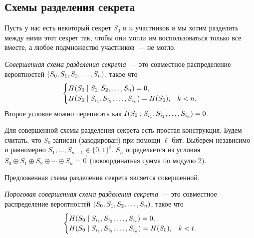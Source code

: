 \documentclass[12pt]{article}
\begin{document}
\subsection{Схемы разделения секрета}

Пусть у нас есть некоторый секрет $S_0$ и $n$ участников и мы хотим разделить между ними этот секрет
так, чтобы они могли им воспользоваться только все вместе, а любое подмножество участников~--- не
могло.
\begin{definition}
    \emph{Совершенная схема разделения секрета}~--- это совместное распределение вероятностей
    $(S_0,{S}_1,{S}_2,\dotsc,{S}_{n})$, такое что
    \[
    \begin{cases}
        H(S_0\mid{S}_1,{S}_2,\dotsc,{S}_{n}) = 0,\\
        H(S_0\mid{S}_{{i}_1},{S}_{{i}_2},\dotsc,{S}_{{i}_{k}}) = H(S_0), & k <  n.
    \end{cases}
    \]
    Второе условие можно переписать как $I(S_0:{S}_{{i}_1},{S}_{{i}_2},\dotsc,{S}_{{i}_{k}}) = 0$.
\end{definition}

Для совершенной схемы разделения секрета есть простая конструкция. Будем считать, что $S_0$
записан (закодирован) при помощи $\ell$ бит. Выберем независимо и равномерно
$S_1,\dotsc,S_{n-1}\in\{0,1\}^\ell$. $S_n$ определяется из условия 
$S_0 \oplus S_1 \oplus S_2 \oplus \dotsb \oplus S_n = \vec 0$ (покоординатная сумма по модулю 2).
\begin{statement}
    Предложенная схема разделения секрета является совершенной.
\end{statement}

\begin{definition}
    \emph{Пороговая совершенная схема разделения секрета}~--- это совместное распределение вероятностей
    $(S_0,{S}_1,{S}_2,\dotsc,{S}_{n})$, такое что
    \[
    \begin{cases}
        H(S_0\mid{S}_{{i}_1},{S}_{{i}_2},\dotsc,{S}_{{i}_{t}}) = 0,\\
        H(S_0\mid{S}_{{i}_1},{S}_{{i}_2},\dotsc,{S}_{{i}_{k}}) = H(S_0), & k < t.
    \end{cases}
    \]
\end{definition}
\end{document}
